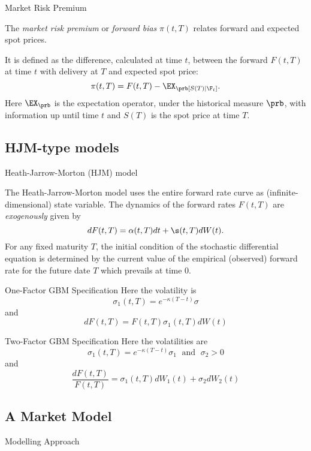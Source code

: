 


{Market Risk Premium}






	The \emph{market risk premium} or \emph{forward bias} $\pi (t,T)$
relates forward and expected spot prices.


	It is defined as the difference, calculated at time $t$, between
the forward $F(t,T)$ at time $t$ with delivery at $T$ and expected
spot price:
\begin{equation}\label{forward risk premium}
\pi(t,T)= F(t,T)-\EX_\prb[S(T)| \F_t].
\end{equation}
Here $\EX_\prb$ is the expectation operator, under the
historical measure $\prb$, with information up until time $t$ and
$S(T)$ is the spot price at time $T$.





\subsection{HJM-type models}

{ Heath-Jarrow-Morton (HJM) model}

The Heath-Jarrow-Morton model uses the entire forward rate curve as
(infinite-dimensional) state variable. The dynamics of the forward rates $F(t,T)$ are {\it exogenously} given by
$$
dF(t,T) = \alpha(t,T) dt + \s(t,T) dW(t).
$$
For any fixed maturity $T$, the
initial condition of the stochastic differential equation
is determined by the current value
of the empirical (observed) forward rate for the future date $T$
which prevails at time $0$.

{One-Factor GBM Specification}
Here the volatility is
$$
\sigma_1(t,T)=e^{-\kappa (T-t)}\sigma
$$
and
$$
dF(t,T)=F(t,T)\sigma_1(t,T)dW(t)
$$

{Two-Factor GBM Specification}
Here the volatilities are
$$
\sigma_1(t,T)=e^{-\kappa (T-t)}\sigma_1 \; \mbox{ and } \; \sigma_2>0
$$
and
$$
\frac{dF(t,T)}{F(t,T)}=\sigma_1(t,T)dW_1(t)+\sigma_2dW_2(t)
$$

\subsection{A Market Model}

{Modelling Approach}


